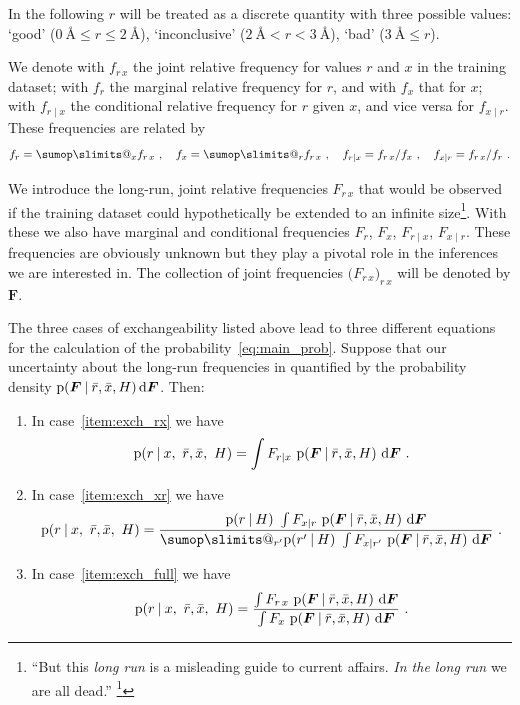 \documentclass[\ifafour a4paper,12pt,\else a5paper,10pt,\fi%
onecolumn,oneside,article,%
british%
]{memoir}
\makeatletter
\theoremstyle{remark}
\theoremstyle{innote}
\def\sum{\DOTSI\sumop\slimits@}
\newcommand*{\citep}{\footcites}
\newcommand*{\di}{\mathrm{d}}%
\renewcommand*{\le}{\leqslant}%
\newcommand*{\p}{\mathrm{p}}%
\renewcommand*{\|}[1][]{\nonscript\:#1\vert\nonscript\:\mathopen{}}
\renewcommand*{\=}{\TextOrMath\texteq\eq}
\newcommand*{\sect}{\S}%
\newcommand*{\q}{}%
\DeclareRobustCommand*{\q}{%
  \mathord{\mathpalette\bigcdot@{}}%
}
\newcommand*{\bigcdot@scalefactor}{0.7}
\newcommand*{\bigcdot@widthfactor}{1.5}
\newcommand*{\bigcdot@}[2]{%
  \sbox0{$#1\vcenter{}$}%
  \sbox2{$#1\cdot\m@th$}%
  \hbox to \bigcdot@widthfactor\wd2{%
    \hfil
    \raise\ht0\hbox{%
      \scalebox{\bigcdot@scalefactor}{%
        \lower\ht0\hbox{$#1\bullet\m@th$}%
      }%
    }%
    \hfil
  }%
}
\newcommand*{\ro}{r}
\newcommand*{\xo}{x}
\newcommand*{\rd}{\bar{r}}
\newcommand*{\xd}{\bar{x}}
\newcommand*{\yF}{\bm{F}}
\makeatother
\begin{document}
In the following $r$ will be treated as a discrete quantity with three
possible values: \enquote*{good}
($0\ \textrm{\AA}\le r \le 2\ \textrm{\AA}$), \enquote*{inconclusive}
($2\ \textrm{\AA} < r < 3\ \textrm{\AA}$), \enquote*{bad}
($3\ \textrm{\AA} \le r$).

We denote with $f_{r\, x}$ the joint relative frequency for values $r$ and
$x$ in the training dataset; with $f_{r\q}$ the marginal relative frequency
for $r$, and with $f_{\q x}$ that for $x$; with $f_{r\mid x}$ the
conditional relative frequency for $r$ given $x$, and vice versa for
$f_{x \mid r}$. These frequencies are related by
\begin{equation}
  \label{eq:frequencies_relations}
  f_{r\q}=\sum_{x} f_{r\,x}\ , \quad
  f_{\q x}=\sum_{r} f_{r\,x}\ ,\quad
  f_{r\mid x}=f_{r\,x}/f_{\q x}\ , \quad
  f_{x\mid r}=f_{r\,x}/f_{r\q}\ .
\end{equation}

We introduce the long-run, joint relative frequencies $F_{r\,x}$ that would
be observed if the training dataset could hypothetically be extended to an
infinite size\footnote{\enquote{But this \emph{long run} is a misleading
    guide to current affairs. \emph{In the long run} we are all dead.}
  \citep[\sect~3.I, p.~65]{keynes1923_r2013}}. With these we also have
marginal and conditional frequencies $F_{r\q}$, $F_{\q x}$, $F_{r\mid x}$,
$F_{x \mid r}$. These frequencies are obviously unknown but they play a
pivotal role in the inferences we are interested in. The collection of
joint frequencies $\bigl(F_{r\,x}\bigr)_{r\,x}$ will be denoted by $\yF$.

\bigskip



The three cases of exchangeability listed above lead to three different
equations for the calculation of the probability~\eqref{eq:main_prob}.
Suppose that our uncertainty about the long-run frequencies in quantified
by the probability density $\p(\yF\|\rd,\xd, H)\,\di\yF$. Then:
\begin{enumerate}[label=\Roman*.]
\item In case~\ref{item:exch_rx} we have
  \begin{equation}
    \label{eq:prob_rx_case_rx}
    \p(\ro \| \xo,\ \rd,\xd,\ H) =
    \int F_{\ro\mid\xo} \ \p(\yF\|\rd,\xd, H)\ \di\yF \ .
  \end{equation}
\item In case~\ref{item:exch_xr} we have
  \begin{equation}
    \label{eq:prob_rx_case_xr}
    \p(\ro \| \xo,\ \rd,\xd,\ H) =
    \frac{
     \p(\ro\| H)\  \int F_{\xo\mid\ro} \ \p(\yF\|\rd,\xd, H)\ \di\yF
    }{
     \sum_{r'} \p(r' \| H)\  \int F_{\xo\mid r'} \ \p(\yF\|\rd,\xd, H)\ \di\yF
      } \ .
  \end{equation}
\item In case~\ref{item:exch_full} we have
  \begin{equation}
    \label{eq:prob_rx_case_full}
    \p(\ro \| \xo,\ \rd,\xd,\ H) =
    \frac{
     \int F_{\ro\,\xo} \ \p(\yF\|\rd,\xd, H)\ \di\yF
    }{
     \int F_{\q\xo} \ \p(\yF\|\rd,\xd, H)\ \di\yF
      } \ .
  \end{equation}
\end{enumerate}
\end{document}
